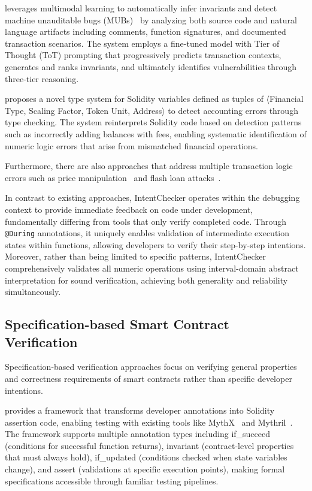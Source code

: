 \documentclass[pdflatex,sn-basic]{sn-jnl}%
\theoremstyle{thmstyleone}%
\theoremstyle{thmstyletwo}%
\theoremstyle{thmstylethree}%
\begin{document}
\citep{smartinv} leverages multimodal learning to automatically infer invariants and detect machine unauditable bugs (MUBs)~\citep{exploitablebugs}
by analyzing both source code and natural language artifacts including comments, function signatures, and documented transaction scenarios.
The system employs a fine-tuned model with Tier of Thought (ToT) prompting that progressively predicts transaction contexts,
generates and ranks invariants, and ultimately identifies vulnerabilities through three-tier reasoning.

\citep{accountingerrors} proposes a novel type system for Solidity variables defined as tuples of $\langle$Financial Type, Scaling Factor, Token Unit, Address$\rangle$
to detect accounting errors through type checking.
The system reinterprets Solidity code based on detection patterns such as incorrectly adding balances with fees,
enabling systematic identification of numeric logic errors that arise from mismatched financial operations.

Furthermore, there are also approaches that address multiple transaction logic errors such as price manipulation~\citep{defiranger,defiguard,pomabuster,secplf,defitainter}
and flash loan attacks~\citep{defitail,midnight}.

In contrast to existing approaches, IntentChecker operates within the debugging context to provide immediate feedback on code under development,
fundamentally differing from tools that only verify completed code.
Through \texttt{@During} annotations, it uniquely enables validation of intermediate execution states within functions,
allowing developers to verify their step-by-step intentions.
Moreover, rather than being limited to specific patterns, IntentChecker comprehensively validates all numeric operations
using interval-domain abstract interpretation for sound verification, achieving both generality and reliability simultaneously.

\subsection{Specification-based Smart Contract Verification}
Specification-based verification approaches focus on verifying general properties and correctness requirements of smart contracts rather than specific developer intentions.

\citep{scribble} provides a framework that transforms developer annotations into Solidity assertion code,
enabling testing with existing tools like MythX~\citep{mythx} and Mythril~\citep{mythril}.
The framework supports multiple annotation types including if\_succeed (conditions for successful function returns),
invariant (contract-level properties that must always hold), if\_updated (conditions checked when state variables change),
and assert (validations at specific execution points), making formal specifications accessible through familiar testing pipelines.
\end{document}
